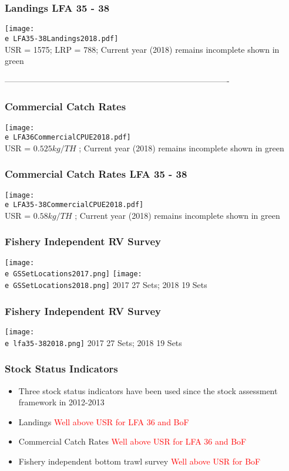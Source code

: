 \documentclass{beamer}
\newcommand{\e}{/SpinDr/backup/bio_data/bio.lobster/figures/}
\begin{document}
\begin{frame}
\frametitle{Landings LFA 35 - 38}
	\centering
	  \texttt{[image: \\e LFA35-38Landings2018.pdf]}\\[-1ex]
	{\tiny{USR = 1575; LRP = 788; Current year (2018) remains incomplete shown in green}}
\end{frame}

----------------------------------------------------------------------------------

\begin{frame}
\frametitle{Commercial Catch Rates}
	\centering
	  \texttt{[image: \\e LFA36CommercialCPUE2018.pdf]}\\[-1ex]
	{\tiny{USR = $0.525 kg/ TH$  ;  Current year (2018) remains incomplete shown in green}}
\end{frame}


\begin{frame}
\frametitle{Commercial Catch Rates LFA 35 - 38}
	\centering
	  \texttt{[image: \\e LFA35-38CommercialCPUE2018.pdf]}\\[-1ex]
	{\tiny{USR = $0.58 kg/ TH$  ;  Current year (2018) remains incomplete shown in green}}
\end{frame}

\clearpage
\begin{frame}
	\frametitle{Fishery Independent RV Survey}
		\centering
	  \texttt{[image: \\e GSSetLocations2017.png]}
	  \texttt{[image: \\e GSSetLocations2018.png]}
	  {\tiny{2017 27 Sets; 2018 19 Sets}}
\end{frame}


\begin{frame}
	\frametitle{Fishery Independent RV Survey}
		\centering
	  \texttt{[image: \\e lfa35-382018.png]}
	  {\tiny{2017 27 Sets; 2018 19 Sets}}
\end{frame}


\begin{frame}

	\frametitle{Stock Status Indicators}

	\begin{itemize}
		\item Three stock status indicators have been used since the stock assessment framework in 2012-2013
		\item Landings \textcolor{red}{Well above USR for LFA 36 and BoF}
		\item Commercial Catch Rates \textcolor{red}{Well above USR for LFA 36 and BoF}
		\item Fishery independent bottom trawl survey \textcolor{red}{Well above USR for BoF}
	\end{itemize}
\end{frame}
\end{document}
